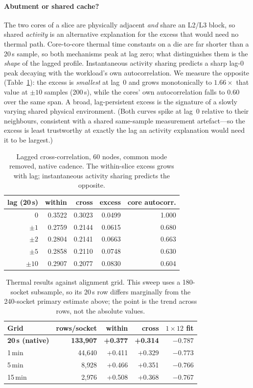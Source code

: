\documentclass[10pt,conference]{IEEEtran}
\begin{document}
\paragraph*{Abutment or shared cache?} The two cores of a slice are physically adjacent
\emph{and} share an L2/L3 block, so shared \emph{activity} is an alternative explanation for the
excess that would need no thermal path. Core-to-core thermal time constants on a die are far
shorter than a 20\,s sample, so both mechanisms peak at lag zero; what distinguishes them is the
\emph{shape} of the lagged profile. Instantaneous activity sharing predicts a sharp lag-0 peak
decaying with the workload's own autocorrelation. We measure the opposite
(Table~\ref{tab:lag}): the excess is \emph{smallest} at lag~0 and grows monotonically to
$1.66\times$ that value at $\pm10$ samples (200\,s), while the cores' own autocorrelation falls to
0.60 over the same span. A broad, lag-persistent excess is the signature of a slowly varying shared
physical environment. (Both curves spike at lag~0 relative to their neighbours, consistent with a
shared same-sample measurement artefact---so the excess is least trustworthy at exactly the lag an
activity explanation would need it to be largest.)

\begin{table}[h]\centering\caption{Lagged cross-correlation, 60 nodes, common mode removed,
native cadence. The within-slice excess grows with lag; instantaneous activity sharing predicts the
opposite.}\label{tab:lag}\footnotesize
\begin{tabular}{rrrrr}\toprule
lag (20\,s) & within & cross & excess & core autocorr.\\\midrule
0 & 0.3522 & 0.3023 & 0.0499 & 1.000\\
$\pm1$ & 0.2759 & 0.2144 & 0.0615 & 0.680\\
$\pm2$ & 0.2804 & 0.2141 & 0.0663 & 0.663\\
$\pm5$ & 0.2858 & 0.2110 & 0.0748 & 0.630\\
$\pm10$ & 0.2907 & 0.2077 & 0.0830 & 0.604\\
\bottomrule\end{tabular}\end{table}

\begin{table}[h]\centering\caption{Thermal results against alignment grid. This sweep uses a
180-socket subsample, so its 20\,s row differs marginally from the 240-socket primary estimate
above; the point is the trend across rows, not the absolute values.}
\label{tab:grid}\footnotesize
\begin{tabular}{lrrrr}\toprule
Grid & rows/socket & within & cross & $1\times12$ fit\\\midrule
\textbf{20\,s (native)} & \textbf{133{,}907} & \textbf{+0.377} & \textbf{+0.314} & \textbf{$-0.787$}\\
1\,min & 44{,}640 & +0.411 & +0.329 & $-0.773$\\
5\,min & 8{,}928 & +0.466 & +0.351 & $-0.766$\\
15\,min & 2{,}976 & +0.508 & +0.368 & $-0.767$\\
\bottomrule\end{tabular}\end{table}
\end{document}

